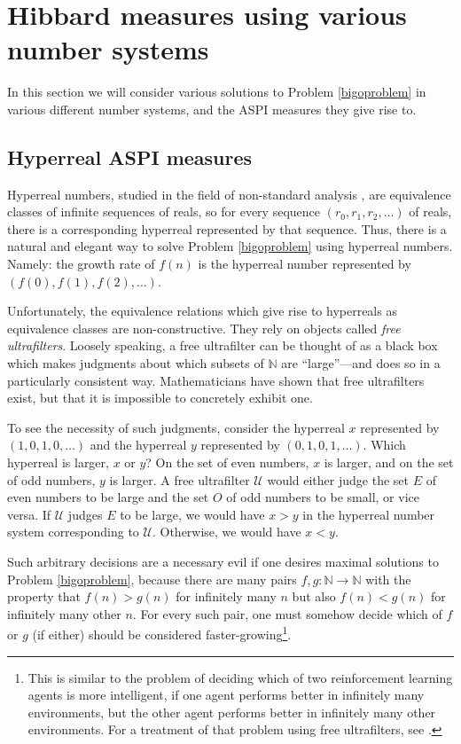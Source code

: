 \documentclass{article}
\begin{document}
\section{Hibbard measures using various number systems}
\label{exoticsection}

In this section we will consider various solutions to
Problem \ref{bigoproblem} in various different number systems,
and the ASPI measures they give rise to.

\subsection{Hyperreal ASPI measures}

Hyperreal numbers, studied in the field of non-standard analysis \cite{robinson}
\cite{goldblatt2012lectures},
are equivalence classes of infinite sequences of reals,
so for every sequence $(r_0,r_1,r_2,\ldots)$ of reals, there is a corresponding
hyperreal represented by that sequence.
Thus, there is a natural and elegant way to solve Problem \ref{bigoproblem}
using hyperreal numbers. Namely: the growth rate of $f(n)$ is the hyperreal number
represented by $(f(0),f(1),f(2),\ldots)$.

Unfortunately, the equivalence relations which give rise to hyperreals as
equivalence classes are non-constructive. They rely on objects called
\emph{free ultrafilters}.
Loosely speaking, a free ultrafilter can be thought
of as a black box which makes judgments about which subsets of $\mathbb N$
are ``large''---and does so in a particularly consistent way.
Mathematicians have shown that free ultrafilters
exist, but that it is impossible to concretely exhibit one.

To see the necessity of such judgments, consider the hyperreal
$x$ represented by $(1,0,1,0,\ldots)$ and the hyperreal $y$ represented by
$(0,1,0,1,\ldots)$. Which hyperreal is larger, $x$ or $y$? On the set of
even numbers, $x$ is larger, and on the set of odd numbers, $y$ is larger.
A free ultrafilter $\mathcal U$ would either judge
the set $E$ of even numbers to be large and the set $O$ of odd numbers to be small,
or vice versa. If $\mathcal U$ judges $E$ to be large,
we would have $x>y$ in the hyperreal number system corresponding to $\mathcal U$.
Otherwise, we would have $x<y$.

Such arbitrary decisions are a necessary evil if one desires maximal solutions to
Problem \ref{bigoproblem}, because there are many pairs $f,g:\mathbb N\to\mathbb N$
with the property that $f(n)>g(n)$ for infinitely many $n$ but also $f(n)<g(n)$ for
infinitely many other $n$. For every such pair, one must
somehow decide which of $f$ or $g$ (if either) should be
considered faster-growing\footnote{This is similar to the problem of deciding which
of two reinforcement learning agents is more intelligent, if one agent
performs better in infinitely many environments, but the other agent performs
better in infinitely many other environments. For a treatment of that problem
using free ultrafilters, see \cite{alexander2019intelligence}.}.
\end{document}
